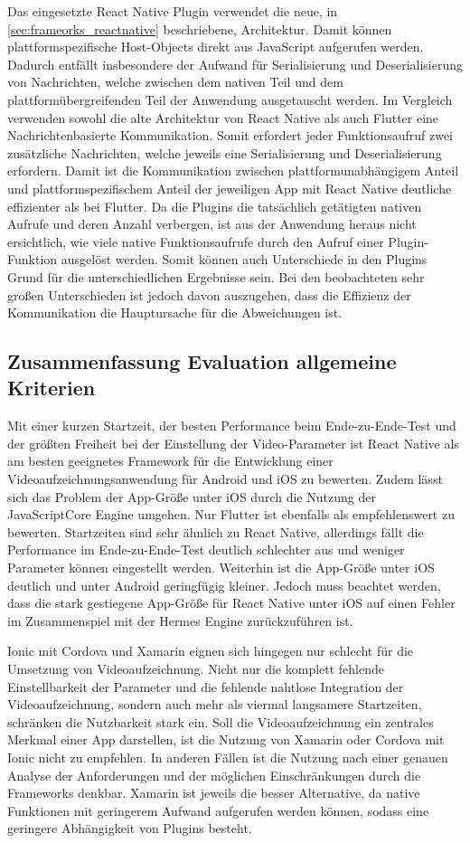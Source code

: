 Das eingesetzte React Native Plugin verwendet die neue, in \autoref{sec:frameorks_reactnative} beschriebene, Architektur.
Damit können plattformspezifische Host-Objects direkt aus JavaScript aufgerufen werden.
Dadurch entfällt insbesondere der Aufwand für Serialisierung und Deserialisierung von Nachrichten, welche zwischen dem nativen Teil und dem plattformübergreifenden Teil der Anwendung ausgetauscht werden.
Im Vergleich verwenden sowohl die alte Architektur von React Native als auch Flutter eine Nachrichtenbasierte Kommunikation.
Somit erfordert jeder Funktionsaufruf zwei zusätzliche Nachrichten, welche jeweils eine Serialisierung und Deserialisierung erfordern.
Damit ist die Kommunikation zwischen plattformunabhängigem Anteil und plattformspezifischem Anteil der jeweiligen App mit React Native deutliche effizienter als bei Flutter.
Da die Plugins die tatsächlich getätigten nativen Aufrufe und deren Anzahl verbergen, ist aus der Anwendung heraus nicht ersichtlich, wie viele native Funktionsaufrufe durch den Aufruf einer Plugin-Funktion ausgelöst werden.
Somit können auch Unterschiede in den Plugins Grund für die unterschiedlichen Ergebnisse sein.
Bei den beobachteten sehr großen Unterschieden ist jedoch davon auszugehen, dass die Effizienz der Kommunikation die Hauptursache für die Abweichungen ist.



\subsection{Zusammenfassung Evaluation allgemeine Kriterien}

Mit einer kurzen Startzeit, der besten Performance beim Ende-zu-Ende-Test und der größten Freiheit bei der Einstellung der Video-Parameter ist React Native als am besten geeignetes Framework für die Entwicklung einer Videoaufzeichnungsanwendung für Android und iOS zu bewerten.
Zudem lässt sich das Problem der App-Größe unter iOS durch die Nutzung der JavaScriptCore Engine umgehen.
Nur Flutter ist ebenfalls als empfehlenswert zu bewerten.
Startzeiten sind sehr ähnlich zu React Native, allerdings fällt die Performance im Ende-zu-Ende-Test deutlich schlechter aus und weniger Parameter können eingestellt werden.
Weiterhin ist die App-Größe unter iOS deutlich und unter Android geringfügig kleiner.
Jedoch muss beachtet werden, dass die stark gestiegene App-Größe für React Native unter iOS auf einen Fehler im Zusammenspiel mit der Hermes Engine zurückzuführen ist.

Ionic mit Cordova und Xamarin eignen sich hingegen nur schlecht für die Umsetzung von Videoaufzeichnung.
Nicht nur die komplett fehlende Einstellbarkeit der Parameter und die fehlende nahtlose Integration der Videoaufzeichnung, sondern auch mehr als viermal langsamere Startzeiten, schränken die Nutzbarkeit stark ein.
Soll die Videoaufzeichnung ein zentrales Merkmal einer App darstellen, ist die Nutzung von Xamarin oder Cordova mit Ionic nicht zu empfehlen.
In anderen Fällen ist die Nutzung nach einer genauen Analyse der Anforderungen und der möglichen Einschränkungen durch die Frameworks denkbar.
Xamarin ist jeweils die besser Alternative, da native Funktionen mit geringerem Aufwand aufgerufen werden können, sodass eine geringere Abhängigkeit von Plugins besteht.


